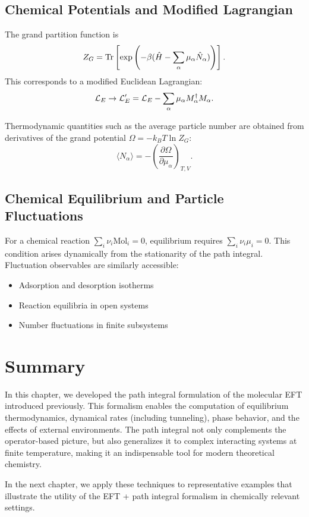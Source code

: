\subsection{Chemical Potentials and Modified Lagrangian}

The grand partition function is
\[
Z_G = \Tr\left[\exp\left(-\beta(\hat{H} - \sum_\alpha \mu_\alpha \hat{N}_\alpha)\right)\right].
\]
This corresponds to a modified Euclidean Lagrangian:
\begin{equation}
	\mathcal{L}_E \rightarrow \mathcal{L}_E' = \mathcal{L}_E - \sum_\alpha \mu_\alpha M^\dagger_\alpha M_\alpha.
\end{equation}

Thermodynamic quantities such as the average particle number are obtained from derivatives of the grand potential \(\Omega = -k_B T \ln Z_G\):
\[
\langle N_\alpha \rangle = -\left(\frac{\partial \Omega}{\partial \mu_\alpha}\right)_{T, V}.
\]

\subsection{Chemical Equilibrium and Particle Fluctuations}

For a chemical reaction \(\sum_i \nu_i \text{Mol}_i = 0\), equilibrium requires \(\sum_i \nu_i \mu_i = 0\). This condition arises dynamically from the stationarity of the path integral. Fluctuation observables are similarly accessible:
\begin{itemize}
	\item Adsorption and desorption isotherms
	\item Reaction equilibria in open systems
	\item Number fluctuations in finite subsystems
\end{itemize}

\section*{Summary}

In this chapter, we developed the path integral formulation of the molecular EFT introduced previously. This formalism enables the computation of equilibrium thermodynamics, dynamical rates (including tunneling), phase behavior, and the effects of external environments. The path integral not only complements the operator-based picture, but also generalizes it to complex interacting systems at finite temperature, making it an indispensable tool for modern theoretical chemistry.

In the next chapter, we apply these techniques to representative examples that illustrate the utility of the EFT + path integral formalism in chemically relevant settings.

